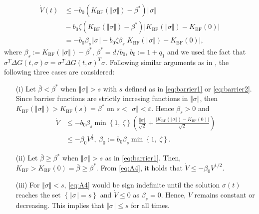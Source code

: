 \documentclass[twocolumn]{autart}    %
\begin{document}
\begin{pf}
\vspace{-2mm}
\begin{equation}\label{eq:A4}
\begin{aligned}
\dot{V}(t)&\leq -b_0(K_{\!\mathrm{BF}\!}(\Vert \sigma \Vert)\!-\!\beta^{*})\Vert \sigma \Vert\\
&\!-\!b_0\zeta(K_{\!\mathrm{BF}\!}(\Vert \sigma \Vert)\!-\!\beta^{*})\vert K_{\!\mathrm{BF}\!}(\Vert \sigma \Vert)\!-\!K_{\!\mathrm{BF}\!}(0)\vert\\
&=-b_0\beta_s\Vert \sigma \Vert-b_0\zeta \beta_s\vert K_{\mathrm{BF}}(\Vert \sigma \Vert)-K_{\mathrm{BF}}(0)\vert,
\end{aligned}
\end{equation} where $\beta_s:=K_{\mathrm{BF}}(\Vert \sigma \Vert)-\beta^{*}$, $\beta^{*}=d/b_0$, $b_0:=1+q_1$ and we used the fact that $\sigma^T \Delta G(t,\sigma) \sigma=\sigma^T \Delta G(t,\sigma)^T \sigma$. Following similar arguments as in \cite{obeid18}, the following three cases are considered:
\vspace{-1mm}
\begin{itemize}
\item[(i)] Let $\bar{\beta}<\beta^{*}$ when $\Vert \sigma \Vert > s$ with $s$ defined as in \eqref{eq:barrier1} or \eqref{eq:barrier2}. Since barrier functions are strictly incresing functions in $\Vert \sigma \Vert$,  then $K_{\mathrm{BF}}(\Vert \sigma \Vert)>K_{\mathrm{BF}}(s)=\beta^{*}$ on $s<\Vert \sigma \Vert<\varepsilon$. Hence $\beta_s>0$ and 
\begin{equation*}
\begin{split}
\dot{V}&\leq -b_0\beta_s\min \left\lbrace1,\: \zeta \right\rbrace(\tfrac{\Vert \sigma \Vert}{\sqrt{2}}+\tfrac{\vert K_{\mathrm{BF}}(\Vert \sigma \Vert)-K_{\mathrm{BF}}(0) \vert}{\sqrt{2}})\\
&\leq -\beta_0V^{\tfrac{1}{2}}, \: \beta_0:=b_0\beta_s\min \left\lbrace1,\: \zeta \right\rbrace.
\end{split}
\end{equation*}
\item[(ii)] Let $\bar{\beta}\geq \beta^{*}$ when $\Vert \sigma \Vert > s$ as in \eqref{eq:barrier1}. Then, $K_{\mathrm{BF}}\!\!>\!K_{\mathrm{BF}}(0)\!\!=\!\!\bar{\beta}\!\!\geq \!\! \beta^{*}$. From \eqref{eq:A4}, it holds that $\dot{V}\leq -\beta_0 V^{1/2}$.
\item[(iii)] For $\Vert \sigma \Vert < s$, \eqref{eq:A4} would be sign indefinite until the solution $\sigma(t)$ reaches the set $\left\lbrace \Vert \sigma \Vert=s \right\rbrace$ and $\dot{V}\leq 0$ as $\beta_s=0$.  Hence, $V$ remains constant or decreasing. This implies that $\Vert \sigma \Vert \leq s$ for all times.

\end{itemize}
\end{pf}
\end{document}

